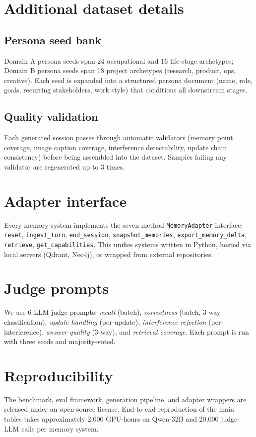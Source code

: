 \documentclass{article}
\begin{document}
\medskip


\appendix

\section{Additional dataset details}
\label{app:data}

\subsection{Persona seed bank}
Domain A persona seeds span 24 occupational and 16 life-stage archetypes;
Domain B persona seeds span 18 project archetypes (research, product, ops,
creative). Each seed is expanded into a structured persona document
(name, role, goals, recurring stakeholders, work style) that conditions
all downstream stages.

\subsection{Quality validation}
Each generated session passes through automatic validators (memory point
coverage, image caption coverage, interference detectability, update
chain consistency) before being assembled into the dataset. Samples
failing any validator are regenerated up to 3 times.

\section{Adapter interface}
\label{app:adapter}
Every memory system implements the seven-method \texttt{MemoryAdapter}
interface: \texttt{reset}, \texttt{ingest\_turn}, \texttt{end\_session},
\texttt{snapshot\_memories}, \texttt{export\_memory\_delta},
\texttt{retrieve}, \texttt{get\_capabilities}. This unifies systems
written in Python, hosted via local servers (Qdrant, Neo4j), or wrapped
from external repositories.

\section{Judge prompts}
\label{app:judges}
We use 6 LLM-judge prompts: \emph{recall} (batch), \emph{correctness}
(batch, 3-way classification), \emph{update handling} (per-update),
\emph{interference rejection} (per-interference), \emph{answer quality}
(3-way), and \emph{retrieval coverage}. Each prompt is run with three
seeds and majority-voted.

\section{Reproducibility}
\label{app:repro}
The benchmark, eval framework, generation pipeline, and adapter wrappers
are released under an open-source license. End-to-end reproduction of
the main tables takes approximately 2{,}000 GPU-hours on Qwen-32B and
20{,}000 judge-LLM calls per memory system.

\newpage


\end{document}
